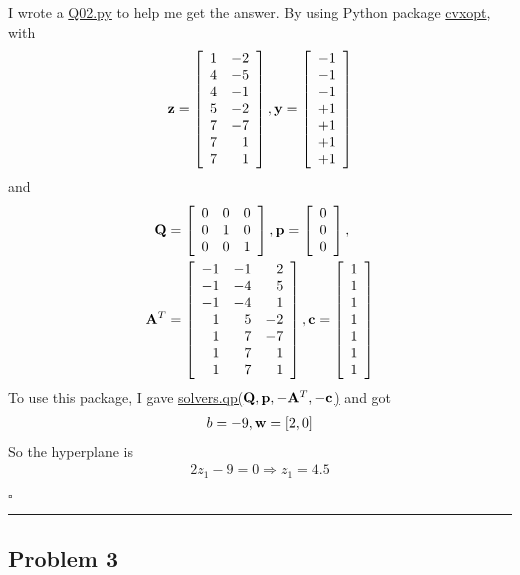 \documentclass[12pt]{article}
\newcommand*{\QEDB}{\hfill\ensuremath{\square}}
\newcommand{\SBrackets}[1]{\left[#1\right]}
\newcommand{\BF}[1]{{\bf#1}}
\newcommand{\Matrix}[2]{\SBrackets{\begin{array}{#1}#2\end{array}}}
\newcommand{\horrule}[1]{\rule{\linewidth}{#1}}
\begin{document}
I wrote a \url{Q02.py} to help me get the answer. By using Python package \url{cvxopt}, with
\begin{align}
\BF{z}=\Matrix{rr}{1&-2\\4&-5\\4&-1\\5&-2\\7&-7\\7&1\\7&1}, \BF{y}=\Matrix{c}{-1\\-1\\-1\\+1\\+1\\+1\\+1}
\end{align}
and
\begin{align}
\BF{Q}&=\Matrix{ccc}{0&0&0\\0&1&0\\0&0&1},\BF{p}=\Matrix{c}{0\\0\\0},\\
\BF{A}^T&=\Matrix{rrr}{-1&-1&2\\-1&-4&5\\-1&-4&1\\1&5&-2\\1&7&-7\\1&7&1\\1&7&1},\BF{c}=\Matrix{c}{1\\1\\1\\1\\1\\1\\1}
\end{align}
To use this package, I gave \url{solvers.qp(}$\BF{Q}, \BF{p}, -\BF{A}^T, -\BF{c}$\url{)} and got
\begin{align}
b=-9,\BF{w}=\SBrackets{2,0}
\end{align}
So the hyperplane is
\begin{align}
2z_1-9=0\Rightarrow z_1=4.5
\end{align}

\QEDB

\horrule{0.5pt}

\subsection*{Problem 3}
\end{document}
